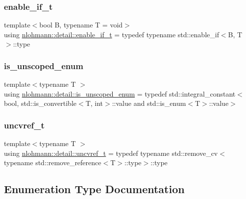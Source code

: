 \subsubsection{\texorpdfstring{enable\_if\_t}{enable\_if\_t}}
{\footnotesize\ttfamily template$<$bool B, typename T  = void$>$ \\
using \mbox{\hyperlink{namespacenlohmann_1_1detail_a02bcbc878bee413f25b985ada771aa9c}{nlohmann\+::detail\+::enable\+\_\+if\+\_\+t}} = typedef typename std\+::enable\+\_\+if$<$B, T$>$\+::type}

\mbox{\label{namespacenlohmann_1_1detail_ab0f6dad10410de436710870e8acc386b}} 
\subsubsection{\texorpdfstring{is\_unscoped\_enum}{is\_unscoped\_enum}}
{\footnotesize\ttfamily template$<$typename T $>$ \\
using \mbox{\hyperlink{namespacenlohmann_1_1detail_ab0f6dad10410de436710870e8acc386b}{nlohmann\+::detail\+::is\+\_\+unscoped\+\_\+enum}} = typedef std\+::integral\+\_\+constant$<$bool, std\+::is\+\_\+convertible$<$T, int$>$\+::value and std\+::is\+\_\+enum$<$T$>$\+::value$>$}

\mbox{\label{namespacenlohmann_1_1detail_a53a082eedad9f4729fcd8fed552a21f7}} 
\subsubsection{\texorpdfstring{uncvref\_t}{uncvref\_t}}
{\footnotesize\ttfamily template$<$typename T $>$ \\
using \mbox{\hyperlink{namespacenlohmann_1_1detail_a53a082eedad9f4729fcd8fed552a21f7}{nlohmann\+::detail\+::uncvref\+\_\+t}} = typedef typename std\+::remove\+\_\+cv$<$typename std\+::remove\+\_\+reference$<$T$>$\+::type$>$\+::type}



\subsection{Enumeration Type Documentation}
\mbox{\label{namespacenlohmann_1_1detail_a90aa5ef615aa8305e9ea20d8a947980f}} 

